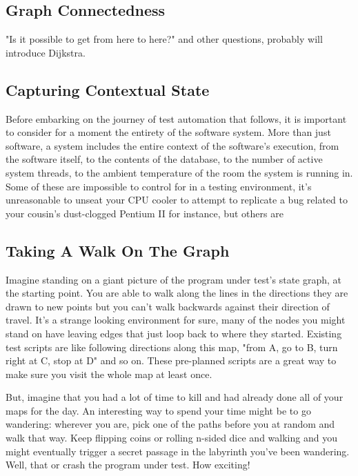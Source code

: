 \subsection{Graph Connectedness}
"Is it possible to get from here to here?" and other questions, probably will introduce Dijkstra. %

\subsection{Capturing Contextual State}
Before embarking on the journey of test automation that follows, it is important to consider for a moment the entirety of the software system. More than just software, a system includes the entire context of the software's execution, from the software itself, to the contents of the database, to the number of active system threads, to the ambient temperature of the room the system is running in. Some of these are impossible to control for in a testing environment, it's unreasonable to unseat your CPU cooler to attempt to replicate a bug related to your cousin's dust-clogged Pentium II for instance, but others are %

\subsection{Taking A Walk On The Graph}
Imagine standing on a giant picture of the program under test's state graph, at the starting point. You are able to walk along the lines in the directions they are drawn to new points but you can't walk backwards against their direction of travel. It's a strange looking environment for sure, many of the nodes you might stand on have leaving edges that just loop back to where they started. Existing test scripts are like following directions along this map, "from A, go to B, turn right at C, stop at D" and so on. These pre-planned scripts are a great way to make sure you visit the whole map at least once.

But, imagine that you had a lot of time to kill and had already done all of your maps for the day. An interesting way to spend your time might be to go wandering: wherever you are, pick one of the paths before you at random and walk that way. Keep flipping coins or rolling n-sided dice and walking and you might eventually trigger a secret passage in the labyrinth you've been wandering. Well, that or crash the program under test. How exciting!


